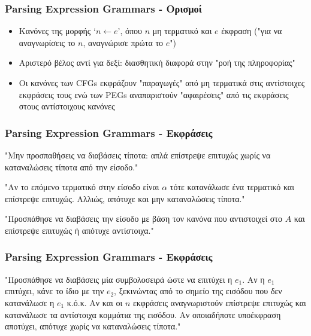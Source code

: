 \documentclass{beamer}
\begin{document}
\begin{frame}
  \frametitle{Parsing Expression Grammars - Ορισμοί}
  \begin{itemize}
	\item Κανόνες της μορφής `$ n \leftarrow e $', όπου $ n$ μη τερματικό και $e$ έκφραση ("για να αναγνωρίσεις το $n$, αναγνώρισε πρώτα το $e$") \pause
	  \item Αριστερό βέλος αντί για δεξί: διασθητική διαφορά στην "ροή της πληροφορίας" \pause
	  \item Oι κανόνες των CFGs εκφράζουν "παραγωγές" από μη τερματικά στις αντίστοιχες εκφράσεις τους ενώ των  PEGs αναπαριστούν "αφαιρέσεις" από τις εκφράσεις στους αντίστοιχους κανόνες
  \end{itemize}
  \end{frame}

\begin{frame}
  \frametitle{Parsing Expression Grammars - Εκφράσεις}

 \begin{description}[font=$\bullet$\scshape\bfseries]
   \item[Κενή συμβολοσειρά `()' :] "Μην προσπαθήσεις να διαβάσεις τίποτα: απλά επίστρεψε επιτυχώς χωρίς να καταναλώσεις τίποτα από την είσοδο." \pause

   \item[Τερματικό `$ \alpha$':] "Αν το επόμενο τερματικό στην είσοδο είναι $ \alpha $ τότε κατανάλωσε ένα τερματικό και επίστρεψε επιτυχώς. Αλλιώς, απότυχε και μην καταναλώσεις τίποτα."\pause

   \item[Μη Τερματικό `$ A $':] "Προσπάθησε να διαβάσεις την είσοδο με βάση τον κανόνα που αντιστοιχεί στο  $ A $ και επίστρεψε επιτυχώς ή απότυχε αντίστοιχα."
  \end{description}
\end{frame}

\begin{frame}
  \frametitle{Parsing Expression Grammars - Εκφράσεις}

 \begin{description}[font=$\bullet$\scshape\bfseries]
   \item[Ακολουθία `$(e_1 e_2 \ldots e_n)$':] "Προσπάθησε να διαβάσεις μία συμβολοσειρά ώστε να επιτύχει η $e_1$. 
	 Αν η $ e_1$ επιτύχει, κάνε το ίδιο με την  $e_2$, ξεκινώντας από το σημείο της εισόδου που δεν κατανάλωσε η  $e_1$ κ.ό.κ. 
	 Αν και οι  $n$ εκφράσεις αναγνωριστούν επίστρεψε επιτυχώς και κατανάλωσε τα αντίστοιχα κομμάτια της εισόδου.
	 Αν οποιαδήποτε υποέκφραση αποτύχει, απότυχε χωρίς να καταναλώσεις τίποτα."

  \end{description}
\end{frame}
\end{document}

